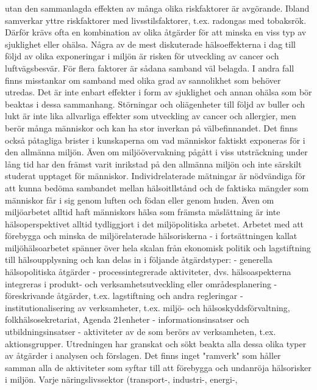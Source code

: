 utan den sammanlagda effekten av många olika riskfaktorer är avgörande. Ibland samverkar yttre riskfaktorer med livsstilsfaktorer, t.ex. radongas med tobaksrök. Därför krävs ofta en kombination av olika åtgärder för att minska en viss typ av sjuklighet eller ohälsa.
Några av de mest diskuterade hälsoeffekterna i dag till följd av olika exponeringar i miljön är risken för utveckling av cancer och luftvägsbesvär. För flera faktorer är sådana samband väl belagda. I andra fall finns misstankar om samband med olika grad av sannolikhet som behöver utredas.
Det är inte enbart effekter i form av sjuklighet och annan ohälsa som bör beaktas i dessa sammanhang. Störningar och oliägenheter till följd av buller och lukt är inte lika allvarliga effekter som utveckling av cancer och allergier, men berör många människor och kan ha stor inverkan på välbefinnandet.
Det finns också påtagliga brister i kunskaperna om vad människor faktiskt exponeras för i den allmänna miljön. Även om miljöövervakning pågått i viss utsträckning under lång tid har den främst varit inrikstad på den allmänna miljön och inte särskilt studerat upptaget för människor. Individrelaterade mätningar är nödvändiga för att kunna bedöma sambandet mellan hälsoitllstånd och de faktiska mängder som människor får i sig genom luften och födan eller genom huden.
Även om miljöarbetet alltid haft människors hälsa som främsta mäslättning är inte hälsoperspektivet alltid tydliggjort i det miljöpolitiska arbetet.
Arbetet med att förebygga och minska de miljörelaterade hälsoriskerna - i fortsättningen kallat miljöhälsoarbetet spänner över hela skalan från ekonomisk politik och lagstiftning till hälsoupplysning och kan delas in i följande åtgärdstyper:
- generella hälsopolitiska åtgärder
- processintegrerade aktiviteter, dvs. hälsoaspekterna integreras i produkt- och verksamhetsutveckling eller områdesplanering
- föreskrivande åtgärder, t.ex. lagstiftning och andra regleringar
- institutionalisering av verksamheter, t.ex. miljö- och hälsoskyddsförvaltning, folkhälsosekretariat, Agenda 21enheter
- informationsinsatser och utbildningsinsatser
- aktiviteter av de som berörs av verksamheten, t.ex. aktionsgrupper.
Utredningen har granskat och sökt beakta alla dessa olika typer av åtgärder i analysen och förslagen.
Det finns inget "ramverk" som håller samman alla de aktiviteter som syftar till att förebygga och undanröja hälsorisker i miljön. Varje näringslivssektor (transport-, industri-, energi-,

